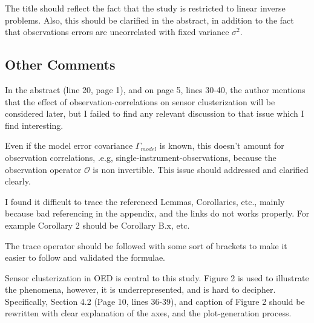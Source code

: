 \documentclass{amsart}
\begin{document}
The title should reflect the fact that the study is restricted to
linear inverse problems. Also, this should be clarified in the
abstract, in addition to the fact that observations errors are
uncorrelated with fixed variance $\sigma^2$.



\subsection{Other Comments}

In the abstract (line 20, page 1), and on page 5, lines 30-40, the
author mentions that the effect of observation-correlations on sensor
clusterization will be considered later, but I failed to find any
relevant discussion to that issue which I find interesting.

Even if the model error covariance $\Gamma_{model}$ is known, this
doesn't amount for observation correlations, .e.g,
single-instrument-observations, because the observation operator
$\mathcal{O}$ is non invertible. This issue should addressed and
clarified clearly.  


I found it difficult to trace the referenced Lemmas, Corollaries,
etc., mainly because bad referencing in the appendix, and the links do
not works properly.  For example Corollary 2 should be Corollary B.x,
etc.  

The trace operator should be followed with some sort of brackets to
make it easier to follow and validated the formulae.

Sensor clusterization in OED is central to this study. Figure 2 is
used to illustrate the phenomena, however, it is underrepresented, and
is hard to decipher. Specifically, Section 4.2 (Page 10, lines 36-39),
and caption of Figure 2 should be rewritten with clear explanation of
the axes, and the plot-generation process.
%
\end{document}
